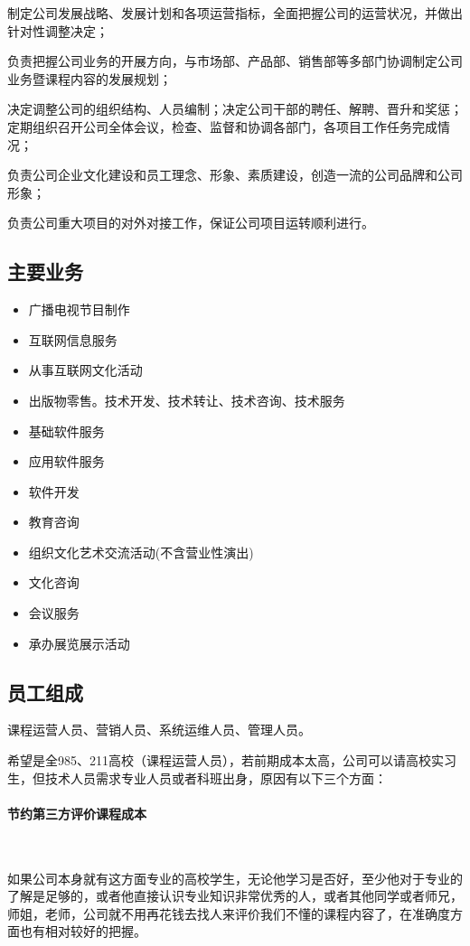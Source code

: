 制定公司发展战略、发展计划和各项运营指标，全面把握公司的运营状况，并做出针对性调整决定；

负责把握公司业务的开展方向，与市场部、产品部、销售部等多部门协调制定公司业务暨课程内容的发展规划；

决定调整公司的组织结构、人员编制；决定公司干部的聘任、解聘、晋升和奖惩；
定期组织召开公司全体会议，检查、监督和协调各部门，各项目工作任务完成情况；

负责公司企业文化建设和员工理念、形象、素质建设，创造一流的公司品牌和公司形象；

负责公司重大项目的对外对接工作，保证公司项目运转顺利进行。

\subsection{主要业务}
\begin{itemize}
  \item 广播电视节目制作
  \item 互联网信息服务
  \item 从事互联网文化活动
  \item 出版物零售。技术开发、技术转让、技术咨询、技术服务
  \item 基础软件服务
  \item 应用软件服务
  \item 软件开发
  \item 教育咨询
  \item 组织文化艺术交流活动(不含营业性演出)
  \item 文化咨询
  \item 会议服务
  \item 承办展览展示活动
\end{itemize}


\subsection{员工组成}
课程运营人员、营销人员、系统运维人员、管理人员。

希望是全985、211高校（课程运营人员），若前期成本太高，公司可以请高校实习生，但技术人员需求专业人员或者科班出身，原因有以下三个方面：

\paragraph{节约第三方评价课程成本}\

如果公司本身就有这方面专业的高校学生，无论他学习是否好，至少他对于专业的了解是足够的，或者他直接认识专业知识非常优秀的人，或者其他同学或者师兄，师姐，老师，公司就不用再花钱去找人来评价我们不懂的课程内容了，在准确度方面也有相对较好的把握。

